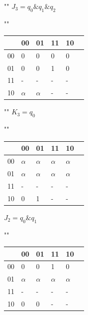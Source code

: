 \documentclass[a4paper,12pt]{article}
\begin{document}
\begin{center}
	""\newline\newline
	$J_{3} = q_{0} \& q_{1} \& q_{2}$
	
	""\newline
	\begin{tabular}{ | l | l | l | l | l | p{1cm} |}
		\hline
		\diagbox[width=5em]{$q_{3}q_{2}$}{$q_{1}q_{0}$} & 00 & 01 & 11 & 10 \\\hline
		00 & 0 & 0  & 0 & 0  \\\hline
		01 & 0 & 0  & \cellcolor{blue!25} 1 & 0  \\\hline
		11 & - & -  & \cellcolor{blue!25} - & -  \\\hline
		10 & $\alpha$ & $\alpha$  & - & -  \\
		\hline
	\end{tabular}

	""\newline\newline
	$K_{3} = q_{0}$
	
	""\newline
	\begin{tabular}{ | l | l | l | l | l | p{1cm} |}
		\hline
		\diagbox[width=5em]{$q_{3}q_{2}$}{$q_{1}q_{0}$} & 00 & 01 & 11 & 10 \\\hline
		00 & $\alpha$ & \cellcolor{blue!25} $\alpha$  & \cellcolor{blue!25} $\alpha$ & $\alpha$  \\\hline
		01 & $\alpha$ & \cellcolor{blue!25} $\alpha$  & \cellcolor{blue!25} $\alpha$ & $\alpha$  \\\hline
		11 & - & \cellcolor{blue!25} -  & \cellcolor{blue!25} - & -  \\\hline
		10 & 0 & \cellcolor{blue!25} 1  & \cellcolor{blue!25} - & -  \\
		\hline
	\end{tabular}

	\clearpage
	$J_{2} = q_{0} \& q_{1}$
	
	""\newline
	\begin{tabular}{ | l | l | l | l | l | p{1cm} |}
		\hline
		\diagbox[width=5em]{$q_{3}q_{2}$}{$q_{1}q_{0}$} & 00 & 01 & 11 & 10 \\\hline
		00 & 0 & 0  & \cellcolor{blue!25} 1 & 0  \\\hline
		01 & $\alpha$ & $\alpha$ & \cellcolor{blue!25} $\alpha$ & $\alpha$  \\\hline
		11 & - & -  & \cellcolor{blue!25} - & -  \\\hline
		10 & 0 & 0  & \cellcolor{blue!25} - & -  \\
		\hline
	\end{tabular}


\end{center}
\end{document}
